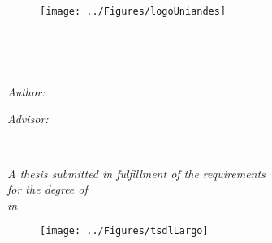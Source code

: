 \documentclass[
12pt, %
english, %
onehalfspacing, %
nolistspacing, %
liststotoc, %
parskip, %
headsepline, %
consistentlayout, %
]{MastersDoctoralThesis} %
\author{Michael \textsc{Osorio-Riaño}} %
\begin{document}
\frontmatter %

\pagestyle{plain} %


\begin{titlepage}
\begin{center}


\begin{figure}[h]
\centering
\texttt{[image: ../Figures/logoUniandes]}
\end{figure}
\vspace{0.3cm} %

\HRule \\[0.4cm] %
{\huge  \ttitle\par}\vspace{0.4cm} %
\HRule \\[1cm] %
 
\begin{minipage}[t]{0.4\textwidth}
\begin{flushleft} \large
\emph{Author:}\\
\href{https://michaelosorio2017.github.io/}{\authorname} %
\end{flushleft}
\end{minipage}
\begin{minipage}[t]{0.3\textwidth}
\begin{flushright} \large
\emph{Advisor:} \\
\href{https://profesores.virtual.uniandes.edu.co/mlinaresv/en/inicio-en/}{\supname} %
\end{flushright}
\end{minipage}\\[1.5cm]
 
\vfill

\large \textit{A thesis submitted in fulfillment of the requirements\\ for the degree of \degreename}\\%
\textit{in}\\%
\begin{figure}[h]
\centering
\texttt{[image: ../Figures/tsdlLargo]}
\end{figure}
\deptname\\[0.5cm] %
 

\end{center}
\end{titlepage}
\end{document}
